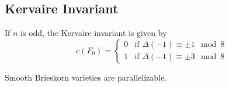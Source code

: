 \subsection{Kervaire Invariant}

\begin{theorem}
\end{theorem}

\begin{theorem}[Levine]
	If $n$ is odd, the Kervaire invariant is given by
	\[
		c(F_0) = \begin{cases}
			0 & \textrm{if }\Delta(-1)\equiv \pm 1\mod 8 \\
			1 & \textrm{if }\Delta(-1)\equiv \pm 3\mod 8
		\end{cases}
	\]
\end{theorem}

\begin{theorem} Smooth Brieskorn varieties are parallelizable.
\end{theorem}
